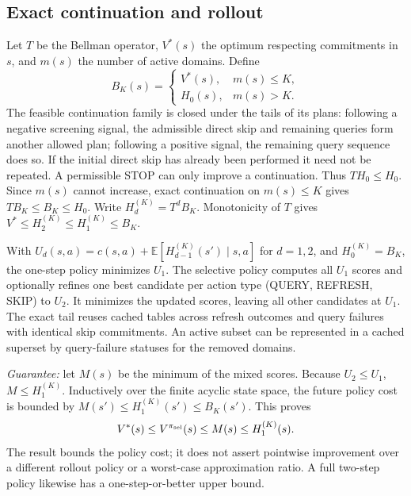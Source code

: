 \documentclass[conference]{IEEEtran}
\begin{document}
\subsection{Exact continuation and rollout}
Let $T$ be the Bellman operator, $V^*(s)$ the optimum respecting
commitments in $s$, and $m(s)$ the number of active domains. Define
\begin{equation}
B_K(s)=\begin{cases}V^*(s),&m(s)\leq K,\\H_0(s),&m(s)>K.\end{cases}
\end{equation}
The feasible continuation family is closed under the tails of its plans:
following a negative screening signal, the admissible direct skip and
remaining queries form another allowed plan; following a positive
signal, the remaining query sequence does so. If the initial direct
skip has already been performed it need not be repeated. A permissible
STOP can only improve a continuation. Thus $TH_0\le H_0$.
Since $m(s)$ cannot increase, exact continuation on $m(s)\le K$ gives
$TB_K\le B_K\le H_0$. Write $H_d^{(K)}=T^dB_K$. Monotonicity of $T$ gives
$V^*\le H_2^{(K)}\le H_1^{(K)}\le B_K$.

With $U_d(s,a)=c(s,a)+\mathbb E[H_{d-1}^{(K)}(s')\mid s,a]$
for $d=1,2$, and $H_0^{(K)}=B_K$, the one-step policy minimizes $U_1$.
The selective policy computes all $U_1$ scores and optionally refines
one best candidate per action type (QUERY, REFRESH, SKIP) to $U_2$.
It minimizes the updated scores, leaving all other candidates at $U_1$.
The exact tail reuses cached tables across refresh outcomes and query
failures with identical skip commitments. An active subset can be
represented in a cached superset by query-failure statuses for the
removed domains.

\textit{Guarantee:} let $M(s)$ be the minimum of the mixed scores.
Because $U_2\le U_1$, $M\le H_1^{(K)}$. Inductively over the finite
acyclic state space, the future policy cost is bounded by
$M(s')\le H_1^{(K)}(s')\le B_K(s')$. This proves
\begin{equation}
 V^*(s)\le V^{\pi_{\rm sel}}(s)\le M(s)\le H_1^{(K)}(s).
\end{equation}
The result bounds the policy cost; it does not assert pointwise
improvement over a different rollout policy or a worst-case
approximation ratio. A full two-step policy likewise has a
one-step-or-better upper bound.
\end{document}
